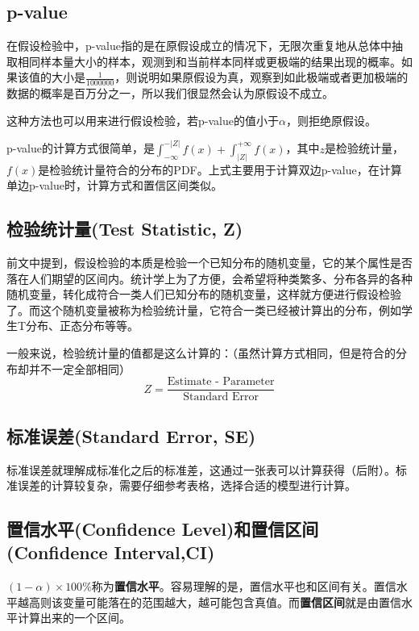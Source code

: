 \documentclass[UTF8]{ctexbook}
\begin{document}
\subsection{p-value}
在假设检验中，p-value指的是在原假设成立的情况下，无限次重复地从总体中抽取相同样本量大小的样本，观测到和当前样本同样或更极端的结果出现的概率。如果该值的大小是$\frac{1}{1000000}$，则说明如果原假设为真，观察到如此极端或者更加极端的数据的概率是百万分之一，所以我们很显然会认为原假设不成立。

这种方法也可以用来进行假设检验，若p-value的值小于$\alpha$，则拒绝原假设。

p-value的计算方式很简单，是$\int_{-\infty}^{-|Z|}f(x)+\int_{|Z|}^{+\infty}f(x)$，其中$z$是检验统计量，$f(x)$是检验统计量符合的分布的PDF。上式主要用于计算双边p-value，在计算单边p-value时，计算方式和置信区间类似。

\subsection{检验统计量(Test Statistic, Z)}
前文中提到，假设检验的本质是检验一个已知分布的随机变量，它的某个属性是否落在人们期望的区间内。统计学上为了方便，会希望将种类繁多、分布各异的各种随机变量，转化成符合一类人们已知分布的随机变量，这样就方便进行假设检验了。而这个随机变量被称为检验统计量，它符合一类已经被计算出的分布，例如学生T分布、正态分布等等。

一般来说，检验统计量的值都是这么计算的：（虽然计算方式相同，但是符合的分布却并不一定全部相同）
\[
Z=\frac{\text{Estimate\ -\ Parameter}}{\text{Standard Error}}
\]
\subsection{标准误差(Standard Error, SE)}
标准误差就理解成标准化之后的标准差，这通过一张表可以计算获得（后附）。标准误差的计算较复杂，需要仔细参考表格，选择合适的模型进行计算。
\subsection{置信水平(Confidence Level)和置信区间(Confidence Interval,CI)}
$(1-\alpha)\times 100\%$称为\textbf{置信水平}。容易理解的是，置信水平也和区间有关。置信水平越高则该变量可能落在的范围越大，越可能包含真值。而\textbf{置信区间}就是由置信水平计算出来的一个区间。
\end{document}
